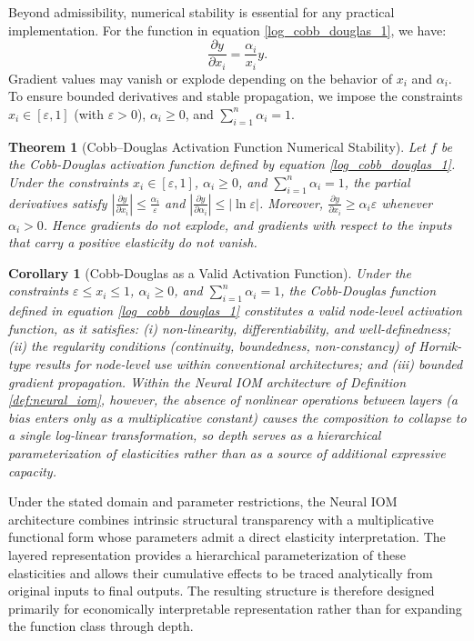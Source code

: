 \documentclass[preprint,12pt,authoryear]{sn-jnl}
\newtheorem{theorem}{Theorem}
\newtheorem{corollary}{Corollary}
\begin{document}
Beyond admissibility, numerical stability is essential for any practical implementation. For the function in equation \ref{log_cobb_douglas_1}, we have:
\[
\frac{\partial y}{\partial x_i} = \frac{\alpha_i}{x_i}y.
\]
Gradient values may vanish or explode depending on the behavior of $x_i$ and $\alpha_i$. To ensure bounded derivatives and stable propagation, we impose the constraints $x_i \in [\varepsilon,1]$ (with $\varepsilon > 0$), $\alpha_i \geq 0$, and $\sum_{i=1}^n \alpha_i = 1$.

\begin{theorem}[Cobb--Douglas Activation Function Numerical Stability] \label{theorem_2}
Let $f$ be the Cobb-Douglas activation function defined by equation \ref{log_cobb_douglas_1}. Under the constraints $x_i \in [\varepsilon, 1]$, $\alpha_i \geq 0$, and $\sum_{i=1}^n \alpha_i = 1$, the partial derivatives satisfy $\left|\frac{\partial y}{\partial x_i}\right| \leq \frac{\alpha_i}{\varepsilon}$ and $\left|\frac{\partial y}{\partial \alpha_i}\right| \leq |\ln \varepsilon|$. Moreover, $\frac{\partial y}{\partial x_i} \geq \alpha_i \varepsilon$ whenever $\alpha_i > 0$. Hence gradients do not explode, and gradients with respect to the inputs that carry a positive elasticity do not vanish.
\end{theorem}

\begin{corollary}[Cobb-Douglas as a Valid Activation Function] \label{corollary}
Under the constraints $\varepsilon \leq x_i \leq 1$, $\alpha_i \geq 0$, and $\sum_{i=1}^n \alpha_i = 1$, the Cobb-Douglas function defined in equation \ref{log_cobb_douglas_1} constitutes a valid node-level activation function, as it satisfies: (i) non-linearity, differentiability, and well-definedness; (ii) the regularity conditions (continuity, boundedness, non-constancy) of Hornik-type results for node-level use within conventional architectures; and (iii) bounded gradient propagation. Within the Neural IOM architecture of Definition \ref{def:neural_iom}, however, the absence of nonlinear operations between layers (a bias enters only as a multiplicative constant) causes the composition to collapse to a single log-linear transformation, so depth serves as a hierarchical parameterization of elasticities rather than as a source of additional expressive capacity.
\end{corollary}

Under the stated domain and parameter restrictions, the Neural IOM architecture combines intrinsic structural transparency with a multiplicative functional form whose parameters admit a direct elasticity interpretation. The layered representation provides a hierarchical parameterization of these elasticities and allows their cumulative effects to be traced analytically from original inputs to final outputs. The resulting structure is therefore designed primarily for economically interpretable representation rather than for expanding the function class through depth.
\end{document}
